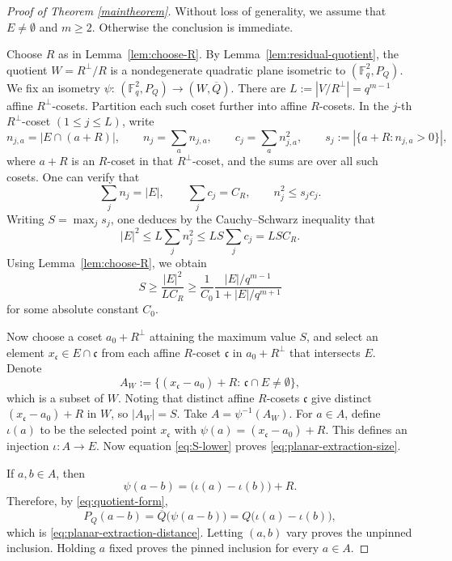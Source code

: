 \documentclass[11pt]{article}
\newcommand{\F}{\mathbb F}
\begin{document}
\begin{proof} [Proof of Theorem \ref{maintheorem}]
Without loss of generality, we assume that $E\neq \emptyset$ and $m\geq 2$. Otherwise the conclusion is immediate. 

Choose $R$ as in Lemma~\ref{lem:choose-R}.  By Lemma~\ref{lem:residual-quotient}, the quotient $W=R^\perp/R$ is a nondegenerate quadratic plane isometric to $(\F_q^2,P_Q)$. We fix an isometry $\psi:\, (\F_q^2,P_Q)\longrightarrow(W,\overline Q)$. There are $L:=|V/R^\perp|=q^{m-1}$ affine $R^\perp$-cosets. Partition each such coset further into affine $R$-cosets. In the $j$-th $R^\perp$-coset $(1\leq j\leq L)$, write
\[
n_{j,a}=|E\cap(a+R)|, \qquad n_j=\sum_a n_{j,a},
 \qquad c_j=\sum_a n_{j,a}^2, \qquad s_j:=|\{a+R:n_{j,a}>0\}|,
\]
where $a+R$ is an $R$-coset in that $R^\perp$-coset, and the sums are over all such cosets. One can verify that
\[
 \sum_jn_j=|E|,
 \qquad
 \sum_jc_j=C_R,
 \qquad
 n_j^2\le s_jc_j.
\]
Writing $S=\max_js_j$, one deduces by the Cauchy--Schwarz inequality that
\[
|E|^2\le L\sum_jn_j^2 \le LS\sum_jc_j =LSC_R.
\]
Using Lemma~\ref{lem:choose-R}, we obtain
\begin{equation}
 \label{eq:S-lower}
 S\ge \frac{|E|^2}{LC_R}\ge
 \frac1{C_0}
 \frac{|E|/q^{m-1}}{1+|E|/q^{m+1}}
\end{equation}
for some absolute constant $C_0$.

Now choose a coset $a_0+R^\perp$ attaining the maximum value $S$, and select an element $x_\mathfrak c\in E\cap \mathfrak c$ from each affine $R$-coset $\mathfrak c$ in $a_0+R^\perp$ that intersects $E$. Denote
\[
A_W:=\{(x_\mathfrak c-a_0)+R:\, \mathfrak c\cap E\neq \emptyset\},
\]
which is a subset of $W$. Noting that distinct affine $R$-cosets $\mathfrak c$ give distinct $(x_\mathfrak c-a_0)+R$ in $W$, so $|A_W|=S$. Take $A=\psi^{-1}(A_W)$. For $a\in A$, define $\iota(a)$ to be the selected point $x_\mathfrak c$ with $\psi(a)=(x_\mathfrak c-a_0)+R$. %
This defines an injection $\iota:A\to E$. Now equation
\eqref{eq:S-lower} proves \eqref{eq:planar-extraction-size}.

If $a,b\in A$, then
\[
 \psi(a-b)
 =\bigl(\iota(a)-\iota(b)\bigr)+R.
\]
Therefore, by \eqref{eq:quotient-form},
\[
 P_Q(a-b)
 =\overline Q\bigl(\psi(a-b)\bigr)
 =Q\bigl(\iota(a)-\iota(b)\bigr),
\]
which is \eqref{eq:planar-extraction-distance}.  Letting $(a,b)$ vary proves the unpinned inclusion.  Holding $a$ fixed proves the pinned inclusion for every $a\in A$.
\end{proof}
\end{document}
